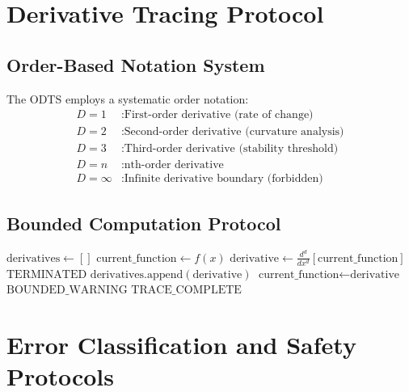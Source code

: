 \documentclass[12pt,a4paper]{article}
\begin{document}
\section{Derivative Tracing Protocol}

\subsection{Order-Based Notation System}

The ODTS employs a systematic order notation:
\begin{align}
D=1 &: \text{First-order derivative (rate of change)} \\
D=2 &: \text{Second-order derivative (curvature analysis)} \\
D=3 &: \text{Third-order derivative (stability threshold)} \\
D=n &: \text{nth-order derivative} \\
D=\infty &: \text{Infinite derivative boundary (forbidden)}
\end{align}

\subsection{Bounded Computation Protocol}

\begin{algorithm}
\caption{ODTS Bounded Derivative Tracing}
\begin{algorithmic}[1]
    \State $\text{derivatives} \leftarrow []$
    \State $\text{current\_function} \leftarrow f(x)$
        \State $\text{derivative} \leftarrow \frac{d^d}{dx^d}[\text{current\_function}]$
            \State \Return $\text{TERMINATED}$
        \EndIf
        \State $\text{derivatives.append}(\text{derivative})$
        \State $\text{current\_function} \leftarrow \text{derivative}$
    \EndFor
        \State \Return $\text{BOUNDED\_WARNING}$
    \EndIf
    \State \Return $\text{TRACE\_COMPLETE}$
\EndProcedure
\end{algorithmic}
\end{algorithm}

\section{Error Classification and Safety Protocols}
\end{document}
